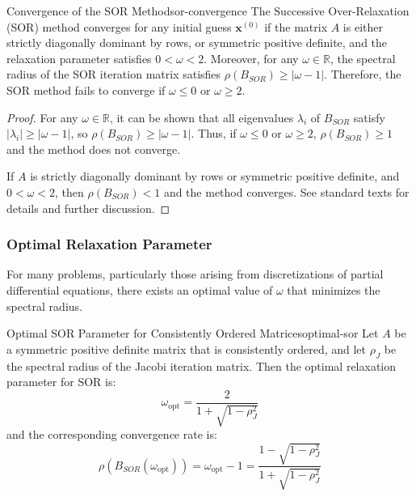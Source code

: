 \begin{theorem}{Convergence of the SOR Method}{sor-convergence}
    The Successive Over-Relaxation (SOR) method converges for any initial guess \(\mathbf{x}^{(0)}\) if the matrix \(A\) is either strictly diagonally dominant by rows, or symmetric positive definite, and the relaxation parameter satisfies \(0 < \omega < 2\).
    Moreover, for any \(\omega \in \mathbb{R}\), the spectral radius of the SOR iteration matrix satisfies \(\rho(B_{SOR}) \geq |\omega - 1|\). Therefore, the SOR method fails to converge if \(\omega \leq 0\) or \(\omega \geq 2\).
\end{theorem}
\begin{proof}
    For any $\omega \in \mathbb{R}$, it can be shown that all eigenvalues $\lambda_i$ of $B_{SOR}$ satisfy $|\lambda_i| \geq |\omega - 1|$, so $\rho(B_{SOR}) \geq |\omega - 1|$. Thus, if $\omega \leq 0$ or $\omega \geq 2$, $\rho(B_{SOR}) \geq 1$ and the method does not converge.

    If $A$ is strictly diagonally dominant by rows or symmetric positive definite, and $0 < \omega < 2$, then $\rho(B_{SOR}) < 1$ and the method converges. See standard texts for details and further discussion.
\end{proof}

\subsubsection{Optimal Relaxation Parameter}

For many problems, particularly those arising from discretizations of partial differential equations, there exists an optimal value of $\omega$ that minimizes the spectral radius.

\begin{theorem}{Optimal SOR Parameter for Consistently Ordered Matrices}{optimal-sor}
    Let $A$ be a symmetric positive definite matrix that is consistently ordered, and let $\rho_J$ be the spectral radius of the Jacobi iteration matrix. Then the optimal relaxation parameter for SOR is:
    \begin{equation}
        \omega_{\text{opt}} = \frac{2}{1 + \sqrt{1 - \rho_J^2}}
    \end{equation}
    and the corresponding convergence rate is:
    \begin{equation}
        \rho(B_{SOR}(\omega_{\text{opt}})) = \omega_{\text{opt}} - 1 = \frac{1 - \sqrt{1 - \rho_J^2}}{1 + \sqrt{1 - \rho_J^2}}
    \end{equation}
\end{theorem}

